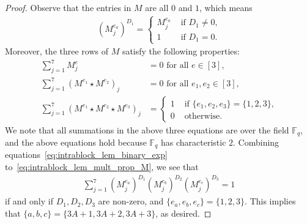 \documentclass[10pt,a4paper]{amsart}
\newcommand{\FF}{\mathbb{F}}
\begin{document}
\begin{proof}
    Observe that the entries in $M$ are all $0$ and $1$, which means 
    \begin{align}
        (M^{e_a}_j)^{D_1} = 
        \begin{cases}
            M^{e_a}_j &\text{ if $D_1\ne 0$,}\\
            1         &\text{ if } D_1 = 0.
        \end{cases}
        \label{eq:intrablock_lem_binary_exp}
    \end{align}
    Moreover, the three rows of $M$ satisfy the following properties: 
    \begin{align}
        \sum_{j=1}^7 M^{e}_j &= 0 \text{ for all $e\in [3]$, } \\
        \sum_{j=1}^7 (M^{e_1}\star M^{e_2})_j &= 0 \text{   for all $e_1,e_2\in [3]$,} \\
        \sum_{j=1}^7 (M^{e_1}\star M^{e_2}\star M^{e_3})_j &=
        \begin{cases}
            1 &\text{ if $\{e_1,e_2,e_3\} = \{1,2,3\}$,} \\
            0 &\text{ otherwise.}
        \end{cases}
        \label{eq:intrablock_lem_mult_prop_M}
    \end{align}
    We note that all summations in the above three equations are over the field $\FF_q$, and the above equations hold because $\FF_q$ has characteristic $2$.
    Combining equations~\eqref{eq:intrablock_lem_binary_exp} to~\eqref{eq:intrablock_lem_mult_prop_M}, we see that 
    \begin{align}
        \sum_{j=1}^7 
        (M^{e_a}_{j})^{D_1} (M^{e_b}_{j})^{D_2} (M^{e_c}_{j})^{D_3} = 1
    \end{align}
    if and only if $D_1,D_2,D_3$ are non-zero, and $\{e_a,e_b,e_c\} = \{1,2,3\}$. 
    This implies that $\{a,b,c\} = \{3A+1,3A+2,3A+3\}$, as desired. 
\end{proof}
\end{document}

